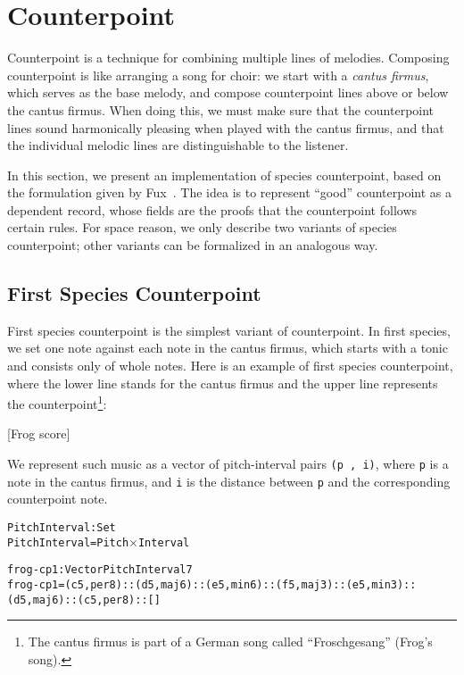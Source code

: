 \section{Counterpoint}
\label{sec:cp}

Counterpoint is a technique for combining multiple lines of melodies.
Composing counterpoint is like arranging a song for choir:
we start with a \emph{cantus firmus}, which serves as the base melody,
and compose counterpoint lines above or below the cantus firmus.
When doing this, we must make sure that the counterpoint lines sound
harmonically pleasing when played with the cantus firmus,
and that the individual melodic lines are distinguishable to the listener.

In this section, we present an implementation of species counterpoint,
based on the formulation given by Fux~\citep{fux-cp}.
The idea is to represent ``good'' counterpoint  as a dependent record,
whose fields are the proofs that the counterpoint follows certain rules.
For space reason, we only describe two variants of species counterpoint;
other variants can be formalized in an analogous way.

\subsection{First Species Counterpoint}
\label{sec:cp:fs}

First species counterpoint is the simplest variant of counterpoint.
In first species, we set one note against each note in the cantus firmus,
which starts with a tonic and consists only of whole notes.
Here is an example of first species counterpoint, where the lower line
stands for the cantus firmus and the upper line represents the
counterpoint\footnote{The cantus firmus is part of a German song
  called ``Froschgesang'' (Frog's song).}:

[Frog score]

We represent such music as a vector of pitch-interval pairs \texttt{(p , i)},
where \texttt{p} is a note in the cantus firmus, and \texttt{i} is the
distance between \texttt{p} and the corresponding counterpoint note.

\begin{alltt}
PitchInterval : Set
PitchInterval = Pitch \(\times\) Interval

frog-cp1 : Vector PitchInterval 7
frog-cp1 = (c 5 , per8) :: (d 5 , maj6) :: (e 5 , min6) :: (f 5 , maj3) :: (e 5 , min3) :: (d 5 , maj6) :: (c 5 , per8) :: []
\end{alltt}

